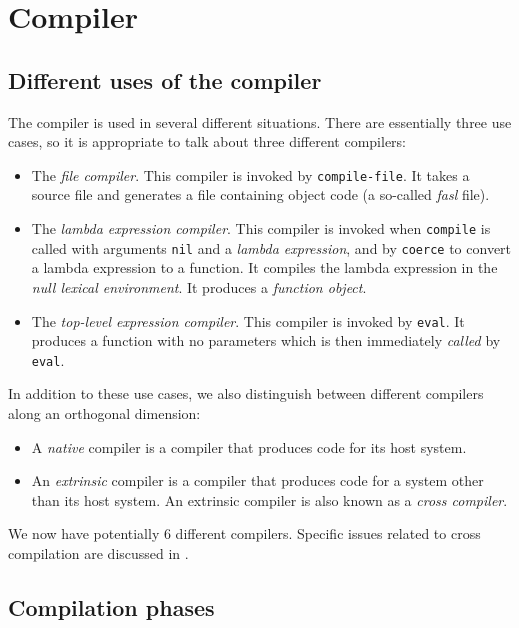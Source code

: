 \chapter{Compiler}
\label{chap-compiler}

\section{Different uses of the compiler}

The compiler is used in several different situations.  There are
essentially three use cases, so it is appropriate to talk about three
different compilers:

\begin{itemize}
\item The \emph{file compiler}.  This compiler is invoked by
  \texttt{compile-file}.  It takes a \commonlisp{} source file and generates a
  file containing object code (a so-called \emph{fasl} file). 
\item The \emph{lambda expression compiler}.  This compiler is invoked
  when \texttt{compile} is called with arguments \texttt{nil} and a
  \emph{lambda expression}, and by \texttt{coerce} to convert a lambda
  expression to a function.  It compiles the lambda expression in the
  \emph{null lexical environment}.  It produces a \emph{function
    object}.
\item The \emph{top-level expression compiler}.  This compiler is
  invoked by \texttt{eval}.  It produces a function with no parameters
  which is then immediately \emph{called} by \texttt{eval}.  
\end{itemize}

In addition to these use cases, we also distinguish between different
compilers along an orthogonal dimension:

\begin{itemize}
\item A \emph{native} compiler is a compiler that produces code for
  its host \commonlisp{} system. 
\item An \emph{extrinsic} compiler is a compiler that produces code
  for a \commonlisp{} system other than its host system.  An extrinsic
  compiler is also known as a \emph{cross compiler}.
\end{itemize}

We now have potentially 6 different compilers.  Specific issues
related to cross compilation are discussed in
. 

\section{Compilation phases}

